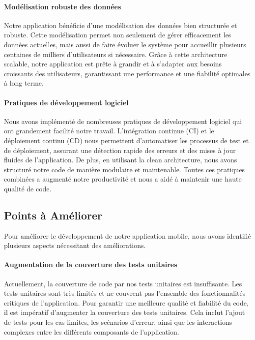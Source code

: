 \paragraph{Modélisation robuste des données}
Notre application bénéficie d'une modélisation des données bien structurée et robuste. Cette modélisation permet non seulement de gérer efficacement les données actuelles, mais aussi de faire évoluer le système pour accueillir plusieurs centaines de milliers d'utilisateurs si nécessaire. Grâce à cette architecture scalable, notre application est prête à grandir et à s'adapter aux besoins croissants des utilisateurs, garantissant une performance et une fiabilité optimales à long terme.

\paragraph{Pratiques de développement logiciel}
Nous avons implémenté de nombreuses pratiques de développement logiciel qui ont grandement facilité notre travail. L'intégration continue (CI) et le déploiement continu (CD) nous permettent d'automatiser les processus de test et de déploiement, assurant une détection rapide des erreurs et des mises à jour fluides de l'application. De plus, en utilisant la clean architecture, nous avons structuré notre code de manière modulaire et maintenable. Toutes ces pratiques combinées a augmenté notre productivité et nous a aidé à maintenir une haute qualité de code.


\subsection{Points à Améliorer}

Pour améliorer le développement de notre application mobile, nous avons identifié plusieurs aspects nécessitant des améliorations.

\paragraph{Augmentation de la couverture des tests unitaires}
Actuellement, la couverture de code par nos tests unitaires est insuffisante. Les tests unitaires sont très limités et ne couvrent pas l'ensemble des fonctionnalités critiques de l'application. Pour garantir une meilleure qualité et fiabilité du code, il est impératif d'augmenter la couverture des tests unitaires. Cela inclut l'ajout de tests pour les cas limites, les scénarios d'erreur, ainsi que les interactions complexes entre les différents composants de l'application.

